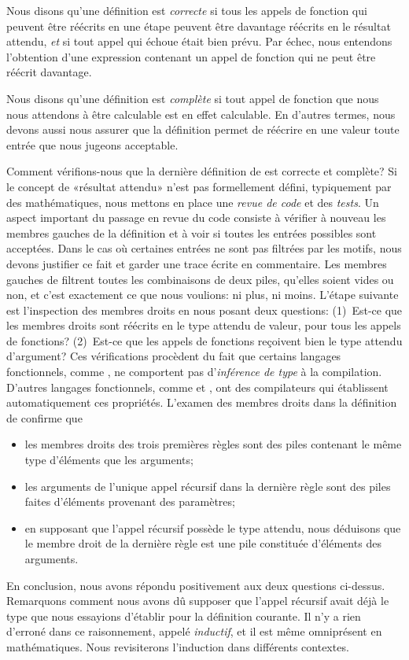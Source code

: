 Nous disons qu'une définition est \emph{correcte} si tous les appels
de fonction qui peuvent être réécrits en une étape peuvent être
davantage réécrits en le résultat attendu, \emph{et} si tout appel qui
échoue était bien prévu. Par échec, nous entendons l'obtention d'une
expression contenant un appel de fonction qui ne peut être réécrit
davantage.

Nous disons qu'une définition est \emph{complète} si tout appel de
fonction que nous nous attendons à être calculable est en effet
calculable. En d'autres termes, nous devons aussi nous assurer que la
définition permet de réécrire en une valeur toute entrée que nous
jugeons acceptable.

Comment vérifions-nous que la dernière définition de  est
correcte et complète? Si le concept de «résultat attendu» n'est pas
formellement défini, typiquement par des mathématiques, nous mettons
en place une \emph{revue de code} et des \emph{tests}. Un aspect
important du passage en revue du code consiste à vérifier à nouveau
les membres gauches de la définition et à voir si toutes les entrées
possibles sont acceptées. Dans le cas où certaines entrées ne sont pas
filtrées par les motifs, nous devons justifier ce fait et garder une
trace écrite en commentaire. Les membres gauches de 
filtrent toutes les combinaisons de deux piles, qu'elles soient vides
ou non, et c'est exactement ce que nous voulions: ni plus, ni
moins. L'étape suivante est l'inspection des membres droits en nous
posant deux questions: (1)~Est-ce que les membres droits sont réécrits
en le type attendu de valeur, pour tous les appels de fonctions?
(2)~Est-ce que les appels de fonctions reçoivent bien le type attendu
d'argument? Ces vérifications procèdent du fait que certains langages
fonctionnels, comme \Erlang, ne comportent pas d'\emph{inférence de
  type} à la compilation. D'autres langages fonctionnels, comme \OCaml
et \Haskell, ont des compilateurs qui établissent automatiquement ces
propriétés. L'examen des membres droits dans la définition de
 confirme que
\begin{itemize}

\item les membres droits des trois premières règles sont des piles
  contenant le même type d'éléments que les arguments;

\item les arguments de l'unique appel récursif dans la dernière règle
  sont des piles faites d'éléments provenant des paramètres;

\item en supposant que l'appel récursif possède le type attendu, nous
  déduisons que le membre droit de la dernière règle est une pile
  constituée d'éléments des arguments.

\end{itemize}
En conclusion, nous avons répondu positivement aux deux questions
ci-dessus. Remarquons comment nous avons dû supposer que l'appel
récursif avait déjà le type que nous essayions d'établir pour la
définition courante. Il n'y a rien d'erroné dans ce raisonnement,
appelé \emph{inductif}, et il est même omniprésent en
mathématiques. Nous revisiterons l'induction dans différents
contextes. 


